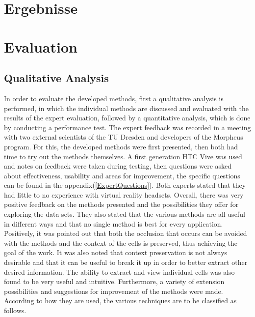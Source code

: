 {\chapter{Ergebnisse}}
{\chapter{Evaluation}}

\label{sec:evaluation}



\section{Qualitative Analysis}
In order to evaluate the developed methods, first a qualitative analysis is performed, in which the individual methods are discussed and evaluated with the results of the expert evaluation, followed by a quantitative analysis, which is done by conducting a performance test.
The expert feedback was recorded in a meeting with two external scientists of the TU Dresden and developers of the Morpheus program. For this, the developed methods were first presented, then both had time to try out the methods themselves. A first generation HTC Vive was used and notes on feedback were taken during testing, then questions were asked about effectiveness, usability and areas for improvement, the specific questions can be found in the appendix(\ref{ExpertQuestions}). Both experts stated that they had little to no experience with virtual reality headsets.
Overall, there was very positive feedback on the methods presented and the possibilities they offer for exploring the data sets.
They also stated that the various methods are all useful in different ways and that no single method is best for every application.
Positively, it was pointed out that both the occlusion that occurs can be avoided with the methods and the context of the cells is preserved, thus achieving the goal of the work.
It was also noted that context preservation is not always desirable and that it can be useful to break it up in order to better extract other desired information.
The ability to extract and view individual cells was also found to be very useful and intuitive.
Furthermore, a variety of extension possibilities and suggestions for improvement of the methods were made.
According to how they are used, the various techniques are to be classified as follows.


